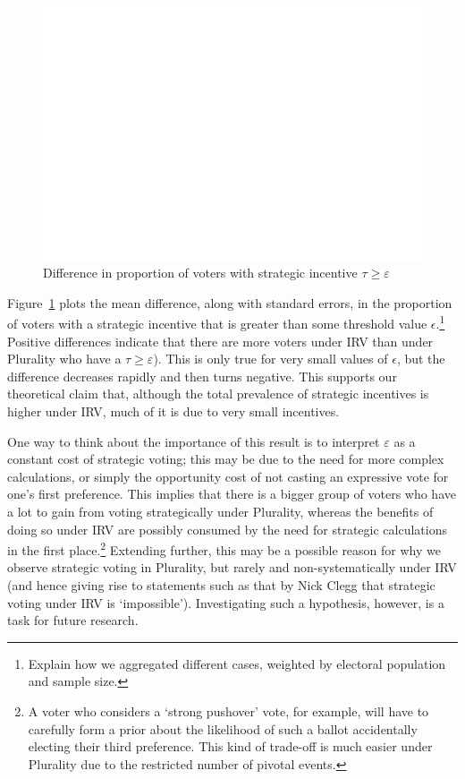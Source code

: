 \documentclass[11pt, letter]{article}
\begin{document}
\begin{figure}[!h]
	\centering
	\includegraphics[width = .8 \textwidth]{"../output/figures/epsilon_true_scale"}
	\caption{Difference in proportion of voters with strategic incentive $\tau \geq \varepsilon$}
	\label{fig:sv_epsilon}
\end{figure}

Figure~\ref{fig:sv_epsilon} plots the mean difference, along with standard errors, in the proportion of voters with a strategic incentive that is greater than some threshold value $\epsilon$.\footnote{Explain how we aggregated different cases, weighted by electoral population and sample size.} Positive differences indicate that there are more voters under IRV than under Plurality who have a $\tau \geq \varepsilon$). This is only true for very small values of $\epsilon$, but the difference decreases rapidly and then turns negative. This supports our theoretical claim that, although the total prevalence of strategic incentives is higher under IRV, much of it is due to very small incentives.

One way to think about the importance of this result is to interpret $\varepsilon$ as a constant cost of strategic voting; this may be due to the need for more complex calculations, or simply the opportunity cost of not casting an expressive vote for one's first preference. This implies that there is a bigger group of voters who have a lot to gain from voting strategically under Plurality, whereas the benefits of doing so under IRV are possibly consumed by the need for strategic calculations in the first place.\footnote{A voter who considers a `strong pushover' vote, for example, will have to carefully form a prior about the likelihood of such a ballot accidentally electing their third preference. This kind of trade-off is much easier under Plurality due to the restricted number of pivotal events.} Extending further, this may be a possible reason for why we observe strategic voting in Plurality, but rarely and non-systematically under IRV (and hence giving rise to statements such as that by Nick Clegg that strategic voting under IRV is `impossible'). Investigating such a hypothesis, however, is a task for future research.
\end{document}
